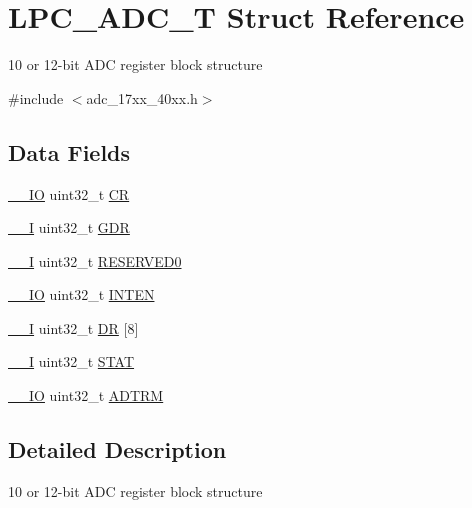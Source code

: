 \hypertarget{structLPC__ADC__T}{\section{L\-P\-C\-\_\-\-A\-D\-C\-\_\-\-T Struct Reference}
\label{structLPC__ADC__T}
}


10 or 12-\/bit A\-D\-C register block structure  




{\ttfamily \#include $<$adc\-\_\-17xx\-\_\-40xx.\-h$>$}

\subsection*{Data Fields}
\begin{DoxyCompactItemize}
\item 
\hyperlink{core__cm3_8h_aec43007d9998a0a0e01faede4133d6be}{\-\_\-\-\_\-\-I\-O} uint32\-\_\-t \hyperlink{structLPC__ADC__T_a751f1cbdd3d5242aea596dc18113fedc}{C\-R}
\item 
\hyperlink{core__cm3_8h_af63697ed9952cc71e1225efe205f6cd3}{\-\_\-\-\_\-\-I} uint32\-\_\-t \hyperlink{structLPC__ADC__T_a063e42ec8fcdcf5590579a8d1a888ca0}{G\-D\-R}
\item 
\hyperlink{core__cm3_8h_af63697ed9952cc71e1225efe205f6cd3}{\-\_\-\-\_\-\-I} uint32\-\_\-t \hyperlink{structLPC__ADC__T_afeba3e59f72b009dfb03377557ddcd60}{R\-E\-S\-E\-R\-V\-E\-D0}
\item 
\hyperlink{core__cm3_8h_aec43007d9998a0a0e01faede4133d6be}{\-\_\-\-\_\-\-I\-O} uint32\-\_\-t \hyperlink{structLPC__ADC__T_a3ed883c378f817342d10cb7ed29a05ae}{I\-N\-T\-E\-N}
\item 
\hyperlink{core__cm3_8h_af63697ed9952cc71e1225efe205f6cd3}{\-\_\-\-\_\-\-I} uint32\-\_\-t \hyperlink{structLPC__ADC__T_a10f521f172d10766bb189be671f8bd57}{D\-R} \mbox{[}8\mbox{]}
\item 
\hyperlink{core__cm3_8h_af63697ed9952cc71e1225efe205f6cd3}{\-\_\-\-\_\-\-I} uint32\-\_\-t \hyperlink{structLPC__ADC__T_a6fd64c9a5717b2adc106721eb9ab190b}{S\-T\-A\-T}
\item 
\hyperlink{core__cm3_8h_aec43007d9998a0a0e01faede4133d6be}{\-\_\-\-\_\-\-I\-O} uint32\-\_\-t \hyperlink{structLPC__ADC__T_a22f04dd0b40c5a05707c0b1e43bd10bd}{A\-D\-T\-R\-M}
\end{DoxyCompactItemize}


\subsection{Detailed Description}
10 or 12-\/bit A\-D\-C register block structure 

